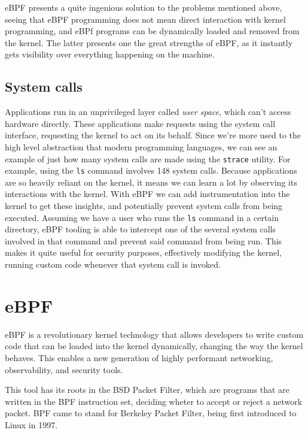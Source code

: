 eBPF presents a quite ingenious solution to the problems mentioned above, seeing that eBPF programming does not mean direct interaction with kernel programming, and eBPf programs can be dynamically loaded and removed from the kernel. The latter presents one the great strengths of eBPF, as it instantly gets visibility over everything happening on the machine.

\subsection{System calls}

Applications run in an unprivileged layer called \textit{user space}, which can't access hardware directly. These applications make requests using the system call interface, requesting the kernel to act on its behalf. Since we're more used to the high level abstraction that modern programming languages, we can see an example of just how many system calls are made using the \texttt{strace} utility. For example, using the \texttt{ls} command involves 148 system calls.
Because applications are so heavily reliant on the kernel, it means we can learn a lot by observing its interactions with the kernel. With eBPF we can add instrumentation into the kernel to get these insights, and potentially prevent system calls from being executed.
Assuming we have a user who runs the \texttt{ls} command in a certain directory, eBPF tooling is able to intercept one of the several system calls involved in that command and prevent said command from being run. This makes it quite useful for security purposes, effectively modifying the kernel, running custom code whenever that system call is invoked.

\section{eBPF}

eBPF is a revolutionary kernel technology that allows developers to write custom code that can be loaded into the kernel dynamically, changing the way the kernel behaves. This enables a new generation of highly performant networking, observability, and security tools.

This tool has its roots in the BSD Packet Filter, which are programs that are written in the BPF instruction set, deciding wheter to accept or reject a network packet. BPF came to stand for Berkeley Packet Filter, being first introduced to Linux in 1997.

